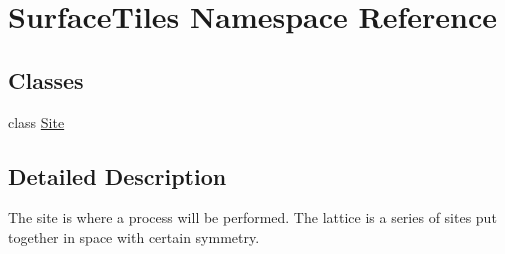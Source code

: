 \hypertarget{namespaceSurfaceTiles}{}\section{Surface\+Tiles Namespace Reference}
\label{namespaceSurfaceTiles}
\subsection*{Classes}
\begin{DoxyCompactItemize}
\item 
class \mbox{\hyperlink{classSurfaceTiles_1_1Site}{Site}}
\end{DoxyCompactItemize}


\subsection{Detailed Description}
The site is where a process will be performed. The lattice is a series of sites put together in space with certain symmetry. 